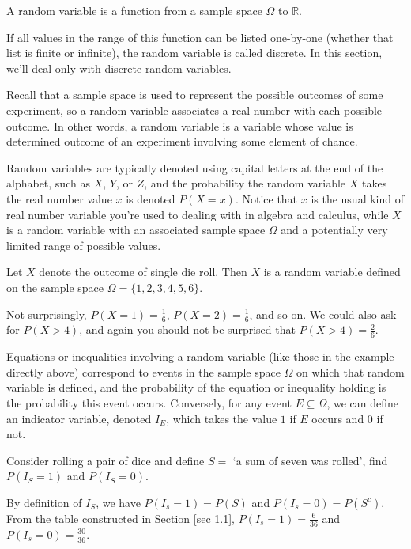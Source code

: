 \begin{defn}\label{RandomVariableDef} A random variable is a function from a sample space $\Omega$ to $\mathbb{R}$. 
\par
\noindent If all values in the range of this function can be listed one-by-one (whether that list is finite or infinite), the random variable is called discrete. In this section, we'll deal only with discrete random variables.
\end{defn}
\par
Recall that a sample space is used to represent the possible outcomes of some experiment, so a random variable associates a real number with each possible outcome. In other words, a random variable is a variable whose value is determined outcome of an experiment involving some element of chance.
\par
Random variables are typically denoted using capital letters at the end of the alphabet, such as $X$, $Y$, or $Z$, and the probability the random variable $X$ takes the real number value $x$ is denoted $P(X = x)$. Notice that $x$ is the usual kind of real number variable you're used to dealing with in algebra and calculus, while $X$ is a random variable with an associated sample space $\Omega$ and a potentially very limited range of possible values.

\begin{examp} Let $X$ denote the outcome of single die roll. Then $X$ is a random variable defined on the sample space $\Omega = \{1,2,3,4,5,6\}$.
\par
\noindent Not surprisingly, $P(X = 1) = \frac{1}{6}$, $P(X = 2) = \frac{1}{6}$, and so on. We could also ask for $P(X > 4)$, and again you should not be surprised that $P(X > 4) = \frac{2}{6}$.
\end{examp}

\par
Equations or inequalities involving a random variable (like those in the example directly above) correspond to events in the sample space $\Omega$ on which that random variable is defined, and the probability of the equation or inequality holding is the probability this event occurs. Conversely, for any event $E \subseteq \Omega$, we can define an indicator variable, denoted $I_{E}$, which takes the value $1$ if $E$ occurs and $0$ if not.

\begin{examp}Consider rolling a pair of dice and define $S =$ `a sum of seven was rolled', find $P(I_S = 1)$ and $P(I_S = 0)$.
\par
\noindent By definition of $I_S$, we have $P(I_s = 1) = P(S)$ and $P(I_s = 0) = P(S^c)$. From the table constructed in Section \ref{sec 1.1}, $P(I_s = 1) = \frac{6}{36}$ and $P(I_s = 0) = \frac{30}{36}$.
\end{examp}

